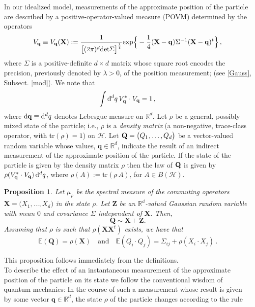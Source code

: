 \documentclass[12pt]{article}
\newtheorem{proposition}[theorem]{Proposition}
\renewcommand{\d}{{\mathrm d}}
\begin{document}
In our idealized model, measurements of the approximate position of the particle are described by a 
positive-operator-valued measure (POVM) determined by the operators
\begin{equation}\label{POVM1}
V_{\bf{q}}\equiv V_{\mathbf{q}}(\mathbf{X})  := \frac{1}{\big[(2\pi)^{d} \text{det}\Sigma\big]^{\frac{1}{4}}} \text{exp}\Big\{-\frac{1}{4}({\bf{X}}-{\bf{q}}) \Sigma^{-1}({\bf{X}}- {\bf{q}})^{t} \Big\}  \,,
\end{equation}
where $\Sigma$ is a positive-definite $d\times d$ matrix whose square root encodes the precision, previously denoted by $\lambda > 0$, of the position measurement; (see \eqref{Gauss}, Subsect. \ref{mod}).
We note that 
\begin{equation}\label{POVM}
\int \d^{d}{q} \, V_{\bf{q}}^{*}\cdot V_{\bf{q}} = 1\,,
\end{equation}
where $\d{\bf{q}} \equiv \d^{d}q$ denotes Lebesgue measure on $\mathbb{R}^{d}$. Let $\rho$ be a general, possibly mixed state of the particle; i.e., $\rho$ is a \textit{density matrix} (a non-negative, trace-class operator, 
with tr$(\rho)=1$) on $\mathcal{H}$. Let ${\bf{Q}}=\big(Q_1, \dots, Q_d \big)$ be a vector-valued random variable whose values, 
$\mathbf{q} \in \mathbb{R}^{d}$, indicate
the result of an indirect measurement of the approximate position of the particle. If the state of the particle is given by the density matrix
$\rho$ then the law of ${\bf{Q}}$ is given by $\rho(V_{\bf{q}}^{*}\cdot V_{\bf{q}})\,\d^{d}q$, where $\rho(A):= \text{tr}(\rho\,A)$,
for $A\in B(\mathcal{H})$.

\begin{proposition}\label{prop:law_Q_0}
	Let $\mu_\rho$ be the spectral measure of the commuting operators $\mathbf X=\big(X_1,\dots,X_d\big)$ in 
	the state $\rho$. 
	Let $\mathbf{Z}$ be an $\mathbb R^d$-valued Gaussian random variable with mean $0$ and covariance $\Sigma$ independent of $\mathbf{X}$. Then,
	$$\mathbf Q\sim \mathbf X+\mathbf Z.$$
Assuming that $\rho$ is such that $\rho(\mathbf{XX}^t)$ exists, we have that
\begin{equation}
\label{3}
\mathbb E(\mathbf Q) = \rho(\mathbf X)\quad \text{and} \quad \mathbb{E}(Q_i \cdot Q_j)=\Sigma_{ij} +
 \rho(X_i\cdot X_j)\,.
\end{equation}
\end{proposition}
This proposition follows immediately from the definitions.\\
To describe the effect of an instantaneous measurement of the approximate position of the particle on its state we 
follow the conventional wisdom of quantum mechanics: In the course of such a measurement whose result is given 
by some vector $\mathbf{q}\in \mathbb{R}^{d}$, the state $\rho$ of the particle changes according to the rule
\end{document}
